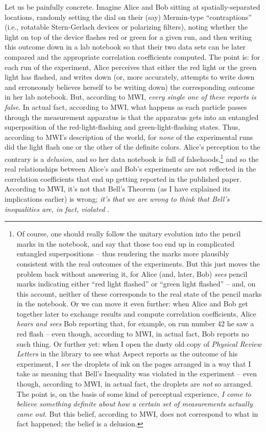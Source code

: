 \documentclass[12pt]{article}
\begin{document}
Let us be painfully concrete.  Imagine Alice and
Bob sitting at spatially-separated locations, randomly setting the
dial on their (say) Mermin-type ``contraptions'' (i.e., rotatable 
Stern-Gerlach devices or polarizing filters), 
noting whether the light on top of the 
device flashes red or green for a given run, and then writing this 
outcome down in a lab notebook so that their two data sets can be
later compared and the appropriate correlation coefficients computed.  
The point is:  for each run of the experiment, Alice perceives that
either the red light or the green light has flashed, and writes down
(or, more accurately, attempts to write down and erroneously believes 
herself to be writing down) the corresponding outcome in her lab notebook.  
But, according to MWI,
\emph{every single one of these reports is false}.  In actual fact,
according to MWI, what happens as each particle passes through the
measurement apparatus is that the apparatus gets into an entangled
superposition of the red-light-flashing and green-light-flashing
states.  Thus, according to MWI's description of the world, for 
\emph{none} of the experimental runs did the light flash
one or the other of the definite colors.  Alice's perception to the
contrary is a \emph{delusion}, and so her data notebook is full of
falsehoods,\footnote{Of course, one should really follow the unitary
  evolution into the pencil marks in the notebook, and say that those
  too end up in complicated entangled superpositions -- thus rendering
  the marks more plausibly consistent with the real outcomes of the
  experiments.  But this just moves the problem back without answering
  it, for Alice (and, later, Bob) \emph{sees} pencil marks
  indicating either ``red light flashed'' or ``green light flashed''
  -- and, on this account, neither of these corresponds to the real
  state of the pencil marks in the notebook.  Or we can  move it even
further:  when Alice and Bob get together later to exchange results
and compute correlation coefficients, Alice \emph{hears and sees} Bob
reporting that, for example, on run number 42 he saw a red
flash -- even though, according to MWI, in actual fact, Bob reports no
such thing.  Or further yet:  when I open the dusty old copy of
\emph{Physical Review Letters} in the library to see what Aspect
reports as the outcome of his experiment, I \emph{see} the droplets 
of ink on the pages arranged in a way that I take as meaning that
Bell's Inequality was violated in the experiment -- even though,
according to MWI, in actual fact, the droplets are \emph{not} so
arranged.  The point is, on the basis of some kind of perceptual
experience, \emph{I come to believe something 
definite about how a certain set of measurements actually came out}.
But this belief, according to MWI, does not correspond to  what in
fact happened; the belief is a delusion.}
and so the real relationships between Alice's and Bob's experiments
are not reflected in the 
correlation coefficients that end up getting
reported in the published paper.  According to MWI,
it's not that Bell's Theorem (as I have explained its implications 
earlier) is wrong; \emph{it's that we are wrong to think that Bell's
inequalities are, in fact, violated}  \cite{albert}.
\end{document}
